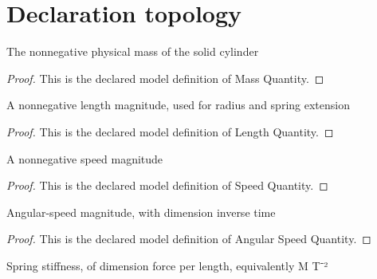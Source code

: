 \section{Declaration topology}
\begin{definition}
  \label{def:physics:phyx-mini-0279:phyxminiproblems-problemphyxmini0279-massquantity}
  The nonnegative physical mass of the solid cylinder
\end{definition}
\begin{proof}
  This is the declared model definition of Mass Quantity.
\end{proof}
\begin{definition}
  \label{def:physics:phyx-mini-0279:phyxminiproblems-problemphyxmini0279-lengthquantity}
  A nonnegative length magnitude, used for radius and spring extension
\end{definition}
\begin{proof}
  This is the declared model definition of Length Quantity.
\end{proof}
\begin{definition}
  \label{def:physics:phyx-mini-0279:phyxminiproblems-problemphyxmini0279-speedquantity}
  A nonnegative speed magnitude
\end{definition}
\begin{proof}
  This is the declared model definition of Speed Quantity.
\end{proof}
\begin{definition}
  \label{def:physics:phyx-mini-0279:phyxminiproblems-problemphyxmini0279-angularspeedquantity}
  Angular-speed magnitude, with dimension inverse time
\end{definition}
\begin{proof}
  This is the declared model definition of Angular Speed Quantity.
\end{proof}
\begin{definition}
  \label{def:physics:phyx-mini-0279:phyxminiproblems-problemphyxmini0279-springconstantquantity}
  Spring stiffness, of dimension force per length, equivalently M T⁻²
\end{definition}
